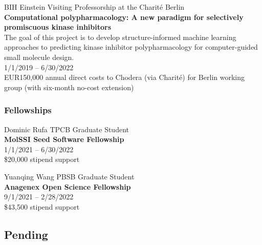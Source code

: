 \documentclass[10pt]{article}
\begin{document}

\vspace{1.5ex}

BIH Einstein Visiting Professorship at the Charit\'{e} Berlin\\
{\bf Computational polypharmacology: A new paradigm for selectively promiscuous kinase inhibitors}\\
The goal of this project is to develop structure-informed machine learning approaches to predicting kinase inhibitor polypharmacology for computer-guided small molecule design.\\
1/1/2019 -- 6/30/2022\\
EUR150,000 annual direct costs to Chodera (via Charit\'{e}) for Berlin working group (with six-month no-cost extension)

%


\vspace{-0.1in} 

\subsubsection*{Fellowships}

Dominic Rufa TPCB Graduate Student\\
{\bf MolSSI Seed Software Fellowship}\\
1/1/2021 -- 6/30/2022\\
\$20,000 stipend support

\vspace{1.5ex} 

Yuanqing Wang PBSB Graduate Student\\
{\bf Anagenex Open Science Fellowship}\\
9/1/2021 -- 2/28/2022\\
\$43,500 stipend support


\eject
\subsection*{Pending}
\end{document}
